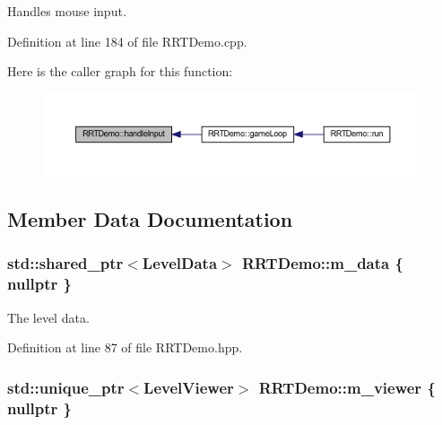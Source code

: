 Handles mouse input. 



Definition at line 184 of file R\+R\+T\+Demo.\+cpp.



Here is the caller graph for this function\+:
\nopagebreak
\begin{figure}[H]
\begin{center}
\leavevmode
\includegraphics[width=350pt]{classRRTDemo_a5273142d4d3b5451e55d3b8609a09dca_icgraph}
\end{center}
\end{figure}




\subsection{Member Data Documentation}
\hypertarget{classRRTDemo_a74d34da51c590f616e41c1d971e2713e}{
\subsubsection[{m\+\_\+data}]{\setlength{\rightskip}{0pt plus 5cm}std\+::shared\+\_\+ptr$<${\bf Level\+Data}$>$ R\+R\+T\+Demo\+::m\+\_\+data \{ nullptr \}\hspace{0.3cm}{\ttfamily [private]}}}\label{classRRTDemo_a74d34da51c590f616e41c1d971e2713e}


The level data. 



Definition at line 87 of file R\+R\+T\+Demo.\+hpp.

\hypertarget{classRRTDemo_adcef94ca094608569dbd8478b65fad08}{
\subsubsection[{m\+\_\+viewer}]{\setlength{\rightskip}{0pt plus 5cm}std\+::unique\+\_\+ptr$<${\bf Level\+Viewer}$>$ R\+R\+T\+Demo\+::m\+\_\+viewer \{ nullptr \}\hspace{0.3cm}{\ttfamily [private]}}}\label{classRRTDemo_adcef94ca094608569dbd8478b65fad08}


